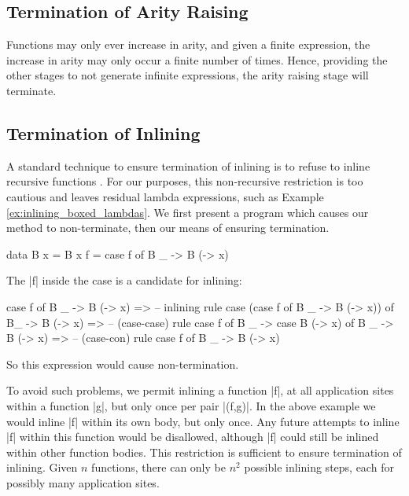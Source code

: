 \documentclass[preprint]{sigplanconf}
\begin{document}
\subsection{Termination of Arity Raising}

Functions may only ever increase in arity, and given a finite expression, the increase in arity may only occur a finite number of times. Hence, providing the other stages to not generate infinite expressions, the arity raising stage will terminate.

\subsection{Termination of Inlining}

A standard technique to ensure termination of inlining is to refuse to inline recursive functions \cite{spj:inlining}. For our purposes, this non-recursive restriction is too cautious and leaves residual lambda expressions, such as Example \ref{ex:inlining_boxed_lambdas}. We first present a program which causes our method to non-terminate, then our means of ensuring termination.

\begin{example}
\begin{code}
data B x = B x
f = case  f of
          B _ -> B (\x -> x)
\end{code}

The |f| inside the case is a candidate for inlining:

\ignore\begin{code}
case f of B _ -> B (\x -> x)
    => -- inlining rule
case (case f of B _ -> B (\x -> x)) of B_ -> B (\x -> x)
    => -- (case-case) rule
case f of B _ -> case B (\x -> x) of B _ -> B (\x -> x)
    => -- (case-con) rule
case f of B _ -> B (\x -> x)
\end{code}

\noindent So this expression would cause non-termination.
\end{example}

To avoid such problems, we permit inlining a function |f|, at all application sites within a function |g|, but only once per pair |(f,g)|. In the above example we would inline |f| within its own body, but only once. Any future attempts to inline |f| within this function would be disallowed, although |f| could still be inlined within other function bodies. This restriction is sufficient to ensure termination of inlining. Given $n$ functions, there can only be $n^2$ possible inlining steps, each for possibly many application sites.
\end{document}
